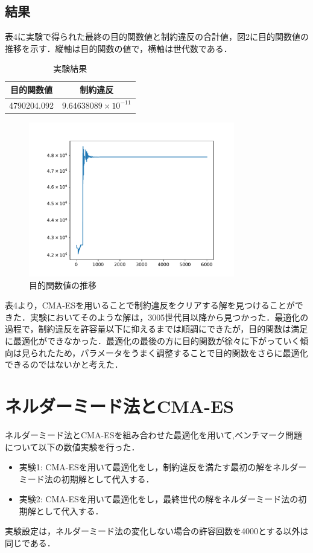 \documentclass[twocolumn]{jarticle}
\begin{document}
	\subsection{結果}
		表4に実験で得られた最終の目的関数値と制約違反の合計値，図2に目的関数値の推移を示す．縦軸は目的関数の値で，横軸は世代数である．
		\begin{table}[htbp]
			\begin{center}
				\caption{実験結果}
				\begin{tabular}{| c | c |} \hline
					目的関数値 & 制約違反 \\ \hline 
					4790204.092 &   $9.64638089\times10^{-11}$ \\ \hline
				\end{tabular}
			\end{center}
		\end{table}
		\begin{figure}
			\centering
            \includegraphics[width=9cm]{cmaes.pdf}
            \caption{目的関数値の推移}
        \end{figure}

		表4より，CMA-ESを用いることで制約違反をクリアする解を見つけることができた．実験においてそのような解は，3005世代目以降から見つかった．最適化の過程で，制約違反を許容量以下に抑えるまでは順調にできたが，目的関数は満足に最適化ができなかった．最適化の最後の方に目的関数が徐々に下がっていく傾向は見られたため，パラメータをうまく調整することで目的関数をさらに最適化できるのではないかと考えた．

\section{ネルダーミード法とCMA-ES}
	ネルダーミード法とCMA-ESを組み合わせた最適化を用いて,ベンチマーク問題について以下の数値実験を行った．
	\begin{itemize}
		\item 実験1: CMA-ESを用いて最適化をし，制約違反を満たす最初の解をネルダーミード法の初期解として代入する．
		\item 実験2: CMA-ESを用いて最適化をし，最終世代の解をネルダーミード法の初期解として代入する．
	\end{itemize}
	実験設定は，ネルダーミード法の変化しない場合の許容回数を4000とする以外は同じである．
\end{document}

